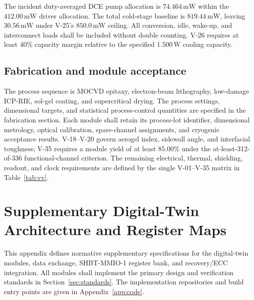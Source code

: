 \documentclass[11pt,a4paper]{article}
\newcommand{\unit}[1]{\,\mathrm{#1}}
\begin{document}
The incident duty-averaged DCE pump allocation is $74.464\unit{mW}$ within the
$412.00\unit{mW}$ driver allocation. The total cold-stage baseline is
$819.44\unit{mW}$, leaving $30.56\unit{mW}$ under V-25's
$850.0\unit{mW}$ ceiling. All conversion, idle, wake-up, and interconnect loads
shall be included without double counting. V-26 requires at least 40\% capacity
margin relative to the specified $1.500\unit W$ cooling capacity.

\subsection{Fabrication and module acceptance}
The process sequence is MOCVD epitaxy, electron-beam lithography, low-damage
ICP-RIE, sol-gel coating, and supercritical drying. The process settings, dimensional
targets, and statistical process-control quantities are specified in the fabrication
section. Each module shall retain its process-lot identifier, dimensional metrology,
optical calibration, spare-channel assignments, and cryogenic acceptance results.
V-18--V-20 govern aerogel index, sidewall angle, and interfacial toughness;
V-35 requires a module yield of at least 85.00\% under the at-least-312-of-336
functional-channel criterion. The remaining electrical, thermal, shielding, readout,
and clock requirements are defined by the single V-01--V-35 matrix in
Table~\ref{tab:vv}.

\clearpage
\section{Supplementary Digital-Twin Architecture and Register Maps}
\label{app:models}
This appendix defines normative supplementary specifications for the digital-twin
modules, data exchange, SHBT-MMIO-1 register bank, and recovery/ECC integration.
All modules shall implement the primary design and verification standards in
Section~\ref{sec:standards}. The implementation repositories and build entry points
are given in Appendix~\ref{app:code}.
\end{document}
